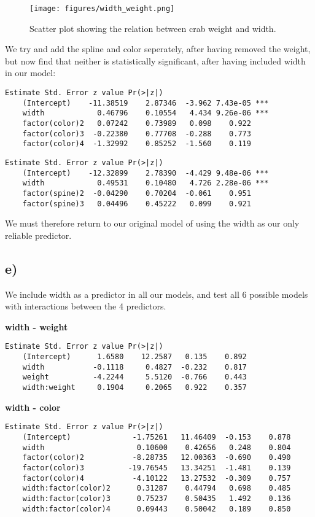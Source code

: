 \documentclass[a4paper, twocolumn]{article}
\begin{document}
\begin{figure}
    \texttt{[image: figures/width\_weight.png]}
    \caption{Scatter plot showing the relation between crab weight and width.}
    \label{fig:width_weight}
\end{figure}

We try and add the spline and color seperately, after having removed the weight, but now find that neither is statistically significant, after having included width in our model:
\begin{Verbatim}[fontsize=\scriptsize]
                    Estimate Std. Error z value Pr(>|z|)    
    (Intercept)    -11.38519    2.87346  -3.962 7.43e-05 ***
    width            0.46796    0.10554   4.434 9.26e-06 ***
    factor(color)2   0.07242    0.73989   0.098    0.922    
    factor(color)3  -0.22380    0.77708  -0.288    0.773    
    factor(color)4  -1.32992    0.85252  -1.560    0.119    
\end{Verbatim}

\begin{Verbatim}[fontsize=\scriptsize]
                    Estimate Std. Error z value Pr(>|z|)    
    (Intercept)    -12.32899    2.78390  -4.429 9.48e-06 ***
    width            0.49531    0.10480   4.726 2.28e-06 ***
    factor(spine)2  -0.04290    0.70204  -0.061    0.951    
    factor(spine)3   0.04496    0.45222   0.099    0.921    
\end{Verbatim}

We must therefore return to our original model of using the width as our only reliable predictor.


\subsection*{e)}
We include width as a predictor in all our models, and test all 6 possible models with interactions between the 4 predictors.

\textbf{width - weight}
\begin{Verbatim}[fontsize=\scriptsize]
                    Estimate Std. Error z value Pr(>|z|)    
    (Intercept)      1.6580    12.2587   0.135    0.892
    width           -0.1118     0.4827  -0.232    0.817
    weight          -4.2244     5.5120  -0.766    0.443
    width:weight     0.1904     0.2065   0.922    0.357
\end{Verbatim}

\textbf{width - color}
\begin{Verbatim}[fontsize=\scriptsize]
                            Estimate Std. Error z value Pr(>|z|)    
    (Intercept)              -1.75261   11.46409  -0.153    0.878
    width                     0.10600    0.42656   0.248    0.804
    factor(color)2           -8.28735   12.00363  -0.690    0.490
    factor(color)3          -19.76545   13.34251  -1.481    0.139
    factor(color)4           -4.10122   13.27532  -0.309    0.757
    width:factor(color)2      0.31287    0.44794   0.698    0.485
    width:factor(color)3      0.75237    0.50435   1.492    0.136
    width:factor(color)4      0.09443    0.50042   0.189    0.850
\end{Verbatim}
\end{document}

